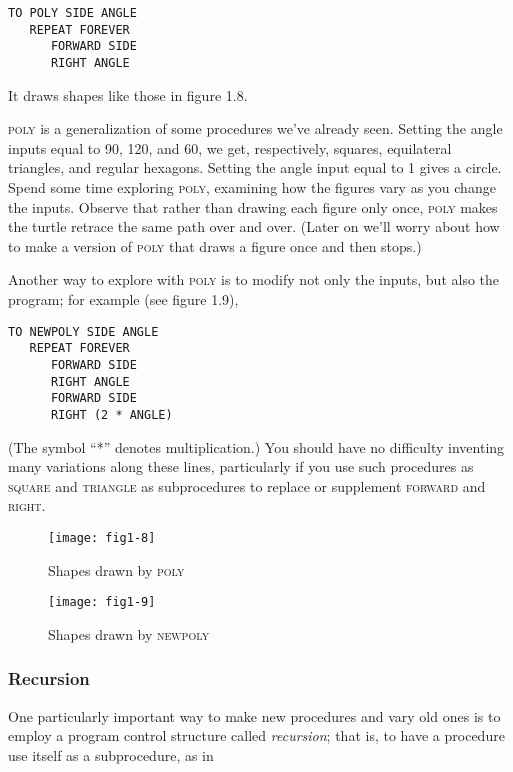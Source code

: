 \documentclass{book}
\begin{document}
\begin{verbatim}
TO POLY SIDE ANGLE
   REPEAT FOREVER
      FORWARD SIDE
      RIGHT ANGLE
\end{verbatim}
It draws shapes like those in figure 1.8.

\textsc{poly} is a generalization of some procedures we've already seen. Setting
the angle inputs equal to 90, 120, and 60, we get, respectively, squares,
equilateral triangles, and regular hexagons. Setting the angle input equal
to 1 gives a circle. Spend some time exploring \textsc{poly}, examining how the
figures vary as you change the inputs. Observe that rather than drawing
each figure only once, \textsc{poly} makes the turtle retrace the same path over
and over. (Later on we'll worry about how to make a version of \textsc{poly}
that draws a figure once and then stops.)

Another way to explore with \textsc{poly} is to modify not only the inputs,
but also the program; for example (see figure 1.9),

\begin{verbatim}
TO NEWPOLY SIDE ANGLE
   REPEAT FOREVER
      FORWARD SIDE
      RIGHT ANGLE
      FORWARD SIDE
      RIGHT (2 * ANGLE)
\end{verbatim}
(The symbol ``*'' denotes multiplication.) You should have no difficulty
inventing many variations along these lines, particularly if you use such
procedures as \textsc{square} and \textsc{triangle} as subprocedures to 
replace or supplement \textsc{forward} and \textsc{right}.

\begin{figure}
\begin{center}
\texttt{[image: fig1-8]}
\caption{Shapes drawn by \textsc{poly}}
\end{center}
\end{figure}

\begin{figure}
\begin{center}
\texttt{[image: fig1-9]}
\caption{Shapes drawn by \textsc{newpoly}}
\end{center}
\end{figure}

\subsubsection{Recursion}

One particularly important way to make new procedures and vary old
ones is to employ a program control structure called {\em recursion}; that is,
to have a procedure use itself as a subprocedure, as in
\end{document}
